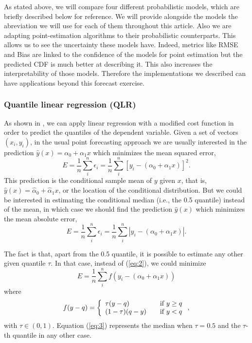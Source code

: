 \documentclass[a4paper,3p,sort&compress]{elsarticle}
\begin{document}
As stated above, we will compare four different probabilistic models,
which are briefly described below for reference. We will provide 
alongside the models the abreviation we will use for each of them 
throughout this article. Also we are adapting point-estimation 
algorithms to their probabilistic counterparts. This allows 
us to see the uncertainty these models have. Indeed, metrics like 
RMSE and Bias are linked to the confidence of the models for 
point estimation but the predicted CDF is much better at describing 
it. This also increases the interpretability of those models.
Therefore 
the implementations we described can have applications beyond 
this forecast exercise.

\subsubsection{Quantile linear regression (QLR)}

As shown in \cite{koenker_quantile_2001}, we can apply linear
regression with a modified cost function in order to predict the
quantiles of the dependent variable.  Given a set of vectors
$(x_i, y_i)$, in the usual point forecasting approach we are usually
interested in the prediction $\hat y(x) = \alpha_0 + \alpha_1 x$ which
minimizes the mean squared error,
\begin{equation}
  \label{eq:1}
  E = \frac{1}{n} \sum^n_i \epsilon_i =
  \frac{1}{n} \sum^n_i [ y_i - (\alpha_0 + \alpha_1 x) ]^2.
\end{equation}
This prediction is the conditional sample mean of $y$ given $x$, that
is, $\hat y(x) = \hat\alpha_0 + \hat\alpha_1 x$, or the location of
the conditional distribution. But we could be interested in estimating
the conditional median (i.e., the 0.5 quantile) instead of the mean,
in which case we should find the prediction $\hat y(x)$ which
minimizes the mean absolute error,
\begin{equation}
  \label{eq:2}
  E = \frac{1}{n} \sum^n_i \epsilon_i =
  \frac{1}{n} \sum^n_i | y_i - (\alpha_0 + \alpha_1 x) |.
\end{equation}

The fact is that, apart from the 0.5 quantile, it is possible to
estimate any other given quantile $\tau$. In that case, instead of
(\ref{eq:2}), we could minimize
\begin{equation}
  \label{eq:3}
  E= \frac{1}{n} \sum^n_i f( y_i - (\alpha_0 + \alpha_1 x))
\end{equation}
where
\begin{equation}
  \label{eq:4}
  f(y-q) = \left\{ 
    \begin{array}{l l}
      \tau (y-q) & \quad \mbox{if $y \ge q$}\\
      (1-\tau) (q-y) & \quad \mbox{if $y < q$}\\
    \end{array} \right.,
\end{equation}
with $\tau \in (0,1)$. Equation (\ref{eq:3}) represents the median
when $\tau=0.5$ and the $\tau$-th quantile in any other case.
\end{document}
